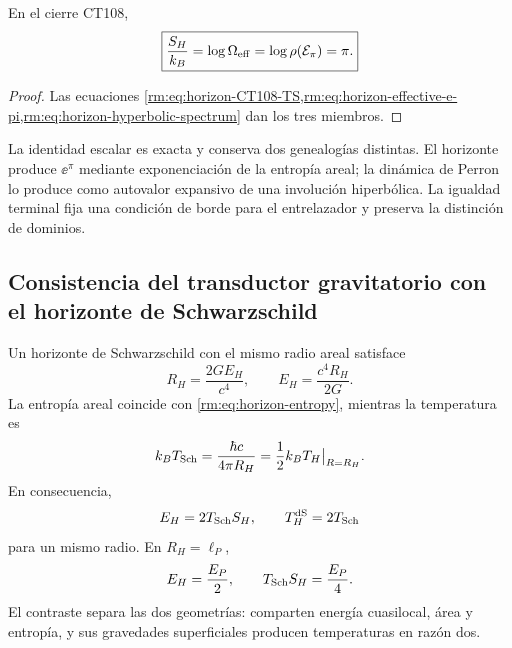 \begin{corollary}
\label{rm:cor:horizon-Perron-scalar}
En el cierre CT108,
\begin{equation}
 \boxed{
 \frac{S_H}{k_B}
 =\log\Omega_{\rm eff}
 =\log\rho(\mathcal E_\pi)
 =\pi.}
 \label{rm:eq:horizon-Perron-log}
\end{equation}
\end{corollary}

\begin{proof}
Las ecuaciones
\cref{rm:eq:horizon-CT108-TS,rm:eq:horizon-effective-e-pi,rm:eq:horizon-hyperbolic-spectrum}
dan los tres miembros.
\end{proof}

La identidad escalar es exacta y conserva dos genealog\'ias distintas. El
horizonte produce \(\ee^\pi\) mediante exponenciaci\'on de la entrop\'ia
areal; la din\'amica de Perron lo produce como autovalor expansivo de una
involuci\'on hiperb\'olica. La igualdad terminal fija una condici\'on de borde
para el entrelazador y preserva la distinci\'on de dominios.

\subsection{Consistencia del transductor gravitatorio con el horizonte de Schwarzschild}

Un horizonte de Schwarzschild con el mismo radio areal satisface
\begin{equation}
 R_H=\frac{2GE_H}{c^4},
 \qquad
 E_H=\frac{c^4R_H}{2G}.
 \label{rm:eq:horizon-Schwarzschild-energy}
\end{equation}
La entrop\'ia areal coincide con \cref{rm:eq:horizon-entropy}, mientras la
temperatura es
\begin{equation}
 k_BT_{\rm Sch}=\frac{\hbar c}{4\pi R_H}
 =\frac12k_BT_H\big|_{R=R_H}.
 \label{rm:eq:horizon-Schwarzschild-temperature}
\end{equation}
En consecuencia,
\begin{equation}
 E_H=2T_{\rm Sch}S_H,
 \qquad
 T_H^{\rm dS}=2T_{\rm Sch}
 \label{rm:eq:horizon-Schwarzschild-Smarr}
\end{equation}
para un mismo radio. En \(R_H=\ell_P\),
\begin{equation}
 E_H=\frac{E_P}{2},
 \qquad
 T_{\rm Sch}S_H=\frac{E_P}{4}.
 \label{rm:eq:horizon-Schwarzschild-Planck}
\end{equation}
El contraste separa las dos geometr\'ias: comparten energ\'ia cuasilocal,
\'area y entrop\'ia, y sus gravedades superficiales producen temperaturas
en raz\'on dos.

